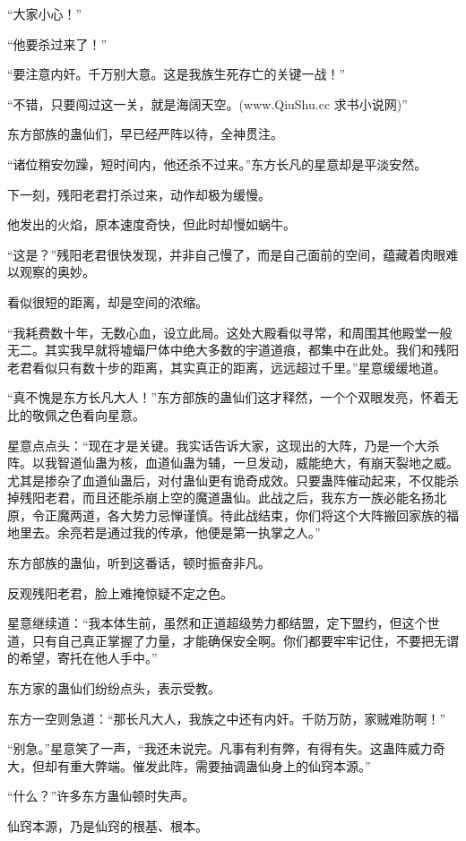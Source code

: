 \begin{this_body}
“大家小心！”

“他要杀过来了！”

“要注意内奸。千万别大意。这是我族生死存亡的关键一战！”

“不错，只要闯过这一关，就是海阔天空。(www.QiuShu.cc 求书小说网)”

东方部族的蛊仙们，早已经严阵以待，全神贯注。

“诸位稍安勿躁，短时间内，他还杀不过来。”东方长凡的星意却是平淡安然。

下一刻，残阳老君打杀过来，动作却极为缓慢。

他发出的火焰，原本速度奇快，但此时却慢如蜗牛。

“这是？”残阳老君很快发现，并非自己慢了，而是自己面前的空间，蕴藏着肉眼难以观察的奥妙。

看似很短的距离，却是空间的浓缩。

“我耗费数十年，无数心血，设立此局。这处大殿看似寻常，和周围其他殿堂一般无二。其实我早就将墟蝠尸体中绝大多数的宇道道痕，都集中在此处。我们和残阳老君看似只有数十步的距离，其实真正的距离，远远超过千里。”星意缓缓地道。

“真不愧是东方长凡大人！”东方部族的蛊仙们这才释然，一个个双眼发亮，怀着无比的敬佩之色看向星意。

星意点点头：“现在才是关键。我实话告诉大家，这现出的大阵，乃是一个大杀阵。以我智道仙蛊为核，血道仙蛊为辅，一旦发动，威能绝大，有崩天裂地之威。尤其是掺杂了血道仙蛊后，对付蛊仙更有诡奇成效。只要蛊阵催动起来，不仅能杀掉残阳老君，而且还能杀崩上空的魔道蛊仙。此战之后，我东方一族必能名扬北原，令正魔两道，各大势力忌惮谨慎。待此战结束，你们将这个大阵搬回家族的福地里去。余亮若是通过我的传承，他便是第一执掌之人。”

东方部族的蛊仙，听到这番话，顿时振奋非凡。

反观残阳老君，脸上难掩惊疑不定之色。

星意继续道：“我本体生前，虽然和正道超级势力都结盟，定下盟约，但这个世道，只有自己真正掌握了力量，才能确保安全啊。你们都要牢牢记住，不要把无谓的希望，寄托在他人手中。”

东方家的蛊仙们纷纷点头，表示受教。

东方一空则急道：“那长凡大人，我族之中还有内奸。千防万防，家贼难防啊！”

“别急。”星意笑了一声，“我还未说完。凡事有利有弊，有得有失。这蛊阵威力奇大，但却有重大弊端。催发此阵，需要抽调蛊仙身上的仙窍本源。”

“什么？”许多东方蛊仙顿时失声。

仙窍本源，乃是仙窍的根基、根本。


\end{this_body}
